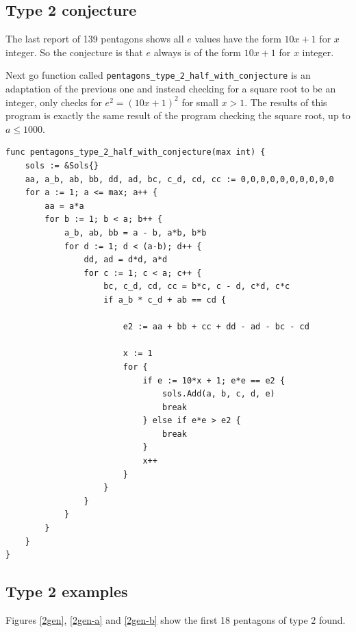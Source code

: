 \documentclass[11pt]{article}
\begin{document}
\subsection{Type 2 conjecture}
The last report of 139 pentagons shows all $e$ values have the form $10x + 1$ for $x$ integer.
So the conjecture is that $e$ always is of the form $10x + 1$ for $x$ integer.

Next go function called \texttt{pentagons\_type\_2\_half\_with\_conjecture}
is an adaptation of the previous one and instead checking for a square root to be an integer,
only checks for $e^2 = (10x+1)^2$ for small $x > 1$.
The results of this program is exactly the same result of the
program checking the square root, up to $a \leq 1000$.
\begin{lstlisting}
func pentagons_type_2_half_with_conjecture(max int) {
	sols := &Sols{}
	aa, a_b, ab, bb, dd, ad, bc, c_d, cd, cc := 0,0,0,0,0,0,0,0,0,0
	for a := 1; a <= max; a++ {
		aa = a*a
		for b := 1; b < a; b++ {
			a_b, ab, bb = a - b, a*b, b*b
			for d := 1; d < (a-b); d++ {
				dd, ad = d*d, a*d
				for c := 1; c < a; c++ {
					bc, c_d, cd, cc = b*c, c - d, c*d, c*c
					if a_b * c_d + ab == cd {

						e2 := aa + bb + cc + dd - ad - bc - cd

						x := 1
						for {
							if e := 10*x + 1; e*e == e2 {
								sols.Add(a, b, c, d, e)
								break
							} else if e*e > e2 {
								break
							}
							x++
						}
					}
				}
			}
		}
	}
}

\end{lstlisting} 

\subsection{Type 2 examples}

Figures \ref{2gen}, \ref{2gen-a} and \ref{2gen-b} show the first 18 pentagons of type 2 found.
\end{document}
